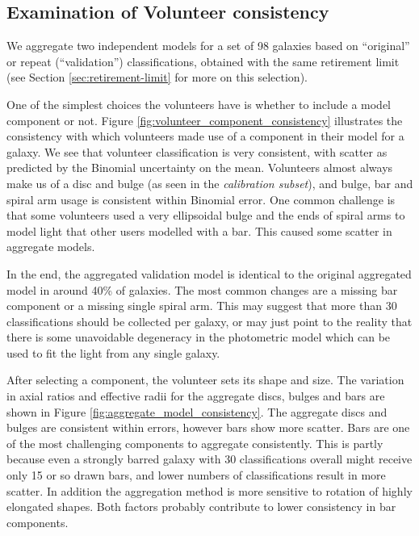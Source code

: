 \documentclass[../main.tex]{subfiles}
\begin{document}
\subsection{Examination of Volunteer consistency}
We aggregate two independent models for a set of 98 galaxies based on ``original'' or repeat (``validation'') classifications, obtained with the same retirement limit (see Section \ref{sec:retirement-limit} for more on this selection).

One of the simplest choices the volunteers have is whether to include a model component or not. Figure \ref{fig:volunteer_component_consistency} illustrates the consistency with which volunteers made use of a component in their model for a galaxy. We see that volunteer classification is very consistent, with scatter as predicted by the Binomial uncertainty on the mean. Volunteers almost always make us of a disc and bulge (as seen in the \textit{calibration subset}), and bulge, bar and spiral arm usage is consistent within Binomial error. One common challenge is that some volunteers used a very ellipsoidal bulge and the ends of spiral arms to model light that other users modelled with a bar. This caused some scatter in aggregate models.

In the end, the aggregated validation model is identical to the original aggregated model in around 40\% of galaxies. The most common changes are a missing bar component or a missing single spiral arm. This may suggest that more than 30 classifications should be collected per galaxy, or may just point to the reality that there is some unavoidable degeneracy in the photometric model which can be used to fit the light from any single galaxy.

\begin{figure*}
  \caption{Comparison of frequency of use of component in volunteer models between the original and validation sets of classifications. Errors shown on the disc, bulge and bar arise from Binomial error estimation.}
  \label{fig:volunteer_component_consistency}
\end{figure*}

After selecting a component, the volunteer sets its shape and size. The variation in axial ratios and effective radii for the aggregate discs, bulges and bars are shown in Figure \ref{fig:aggregate_model_consistency}. The aggregate discs and bulges are consistent within errors, however bars show more scatter. Bars are one of the most challenging components to aggregate consistently. This is partly because even a strongly barred galaxy with 30 classifications overall might receive only 15 or so drawn bars, and lower numbers of classifications result in more scatter. In addition the aggregation method is more sensitive to rotation of highly elongated shapes. Both factors probably contribute to lower consistency in bar components.
\end{document}

